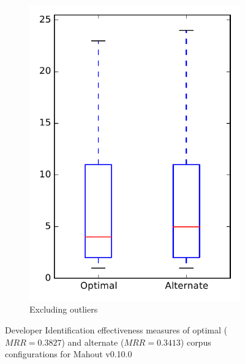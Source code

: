 \begin{figure}
\begin{subfigure}{.4\textwidth}
        \includegraphics[height=0.4\textheight]{figures/combo/dit_rq2_mahout_no_outlier}
        \caption{Excluding outliers}\label{fig:combo:dit:rq2:mahout_no_outlier}
    \end{subfigure}
\caption[Developer Identification effectiveness measures of optimal and alternate corpus configurations for Mahout v0.10.0]%
{Developer Identification effectiveness measures of optimal ($MRR=0.3827$) and alternate ($MRR=0.3413$) corpus configurations for Mahout v0.10.0}
\label{fig:combo:dit:rq2:mahout}
\end{figure}
